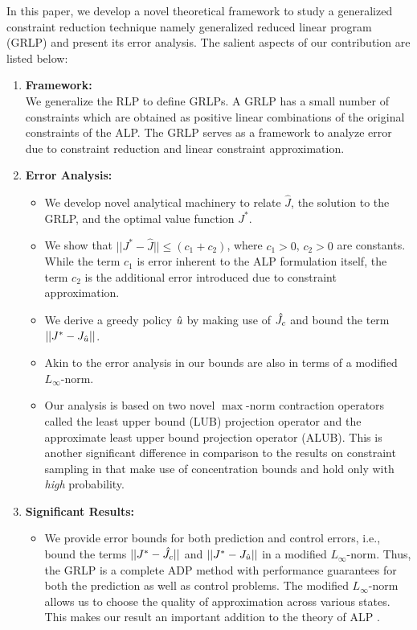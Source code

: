 In this paper, we develop a novel theoretical framework to study a generalized constraint reduction technique namely generalized reduced linear program (GRLP) and present its error analysis. The salient aspects of our contribution are listed below:
\begin{enumerate}
\item \textbf{Framework:}\\ We generalize the RLP to define GRLPs. A GRLP has a small number of constraints which are obtained as positive linear combinations of the original constraints of the ALP. The GRLP serves as a framework to analyze error due to constraint reduction and linear constraint approximation.
\item \textbf{Error Analysis:}
	\begin{itemize}
		\item We develop novel analytical machinery to relate $\hat{J}$, the solution to the GRLP, and the optimal value function $J^*$. 
		\item We show that $||J^*-\hat{J}||\leq (c_1+c_2)$, where $c_1>0$, $c_2>0$ are constants. While the term $c_1$ is error inherent to the ALP formulation itself, the term $c_2$ is the additional error introduced due to constraint approximation.  
		\item We derive a greedy policy $\hat{u}$ by making use of $\hat{J}_c$ and bound the term $||J^*-J_{\hat{u}}||$. 
		\item Akin to the error analysis in \cite{ALP,CS,SALP} our bounds are also in terms of a modified $L_\infty$-norm.
		\item Our analysis is based on two novel $\max$-norm contraction operators called the least upper bound (LUB) projection operator and the approximate least upper bound projection operator (ALUB). This is another significant difference in comparison to the results on constraint sampling in \cite{SALP,CS} that make use of concentration bounds and hold only with \emph{high} probability.
\end{itemize}
\item \textbf{Significant Results:}
	\begin{itemize}
		\item We provide error bounds for both prediction and control errors, i.e., bound the terms $||J^*-\hat{J}_c||$ and $||J^*-J_{\hat{u}}||$ in a modified $L_\infty$-norm. Thus, the GRLP is a complete ADP method with performance guarantees for both the prediction as well as control problems. The modified $L_\infty$-norm allows us to choose the quality of approximation across various states. This makes our result an important addition to the theory of ALP \cite{ALP,CS,CST,SALP}.

\end{itemize}
\end{enumerate}
